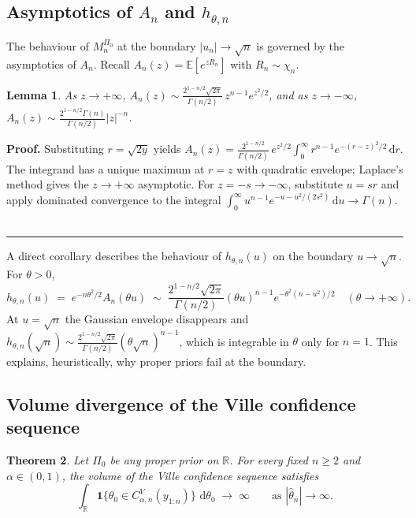 \documentclass{article}%
\newtheorem{theorem}{Theorem}[section]
\newtheorem{lemma}[theorem]{Lemma}
\newenvironment{proof}[1][Proof]{\noindent\textbf{#1.} }{\ \rule{0.5em}{0.5em}}
\newcommand{\R}{\mathbb{R}}
\newcommand{\E}{\mathbb{E}}
\newcommand{\dd}{\,\mathrm{d}}
\newcommand{\one}{\boldsymbol{1}}
\begin{document}
\subsection{Asymptotics of \(A_n\) and \(h_{\theta,n}\)}\label{ssec:asymp}

The behaviour of \(M_n^{\Pi_0}\) at the boundary \(|u_n|\to\sqrt n\) is
governed by the asymptotics of \(A_n\). Recall \(A_n(z)=\E[e^{zR_n}]\)
with \(R_n\sim\chi_n\).

\begin{lemma}\label{lem:An}
As \(z\to+\infty\),
\(A_n(z)\sim \frac{2^{1-n/2}\sqrt{2\pi}}{\Gamma(n/2)}\,z^{n-1}e^{z^2/2}\),
and as \(z\to-\infty\),
\(A_n(z)\sim \frac{2^{1-n/2}\Gamma(n)}{\Gamma(n/2)}|z|^{-n}\).
\end{lemma}

\begin{proof}
Substituting \(r=\sqrt{2y}\) yields
\(A_n(z) = \frac{2^{1-n/2}}{\Gamma(n/2)}\,e^{z^2/2}\int_0^\infty
r^{n-1}e^{-(r-z)^2/2}\dd r\). The integrand has a unique maximum at
\(r=z\) with quadratic envelope; Laplace's method gives the
\(z\to+\infty\) asymptotic. For \(z=-s\to-\infty\), substitute
\(u=sr\) and apply dominated convergence to the integral
\(\int_0^\infty u^{n-1}e^{-u-u^2/(2s^2)}\dd u\to\Gamma(n)\).
\end{proof}

A direct corollary describes the behaviour of \(h_{\theta,n}(u)\) on
the boundary \(u\to\sqrt n\). For \(\theta>0\),
\begin{equation}\label{eq:h-asymp}
  h_{\theta,n}(u)\;=\;e^{-n\theta^2/2}A_n(\theta u)
  \;\sim\;\frac{2^{1-n/2}\sqrt{2\pi}}{\Gamma(n/2)}
   (\theta u)^{n-1}e^{-\theta^2(n-u^2)/2}
   \quad (\theta\to+\infty).
\end{equation}
At \(u=\sqrt n\) the Gaussian envelope disappears and
\(h_{\theta,n}(\sqrt n)\sim \frac{2^{1-n/2}\sqrt{2\pi}}{\Gamma(n/2)}
(\theta\sqrt n)^{n-1}\), which is integrable in \(\theta\) only for
\(n=1\). This explains, heuristically, why proper priors fail at the
boundary.

\subsection{Volume divergence of the Ville confidence sequence}
\label{sec:Ville-divergence}

\begin{theorem}\label{thm:CSVille-divergence}
Let \(\Pi_0\) be any proper prior on \(\R\). For every fixed
\(n\geq 2\) and \(\alpha\in(0,1)\), the volume of the Ville confidence
sequence satisfies
\[
   \int_\R \one\{\theta_0\in C^V_{\alpha,n}(y_{1:n})\}\,\dd\theta_0
   \;\longrightarrow\;\infty
   \qquad\text{as }|\widehat\theta_n|\to\infty.
\]
\end{theorem}
\end{document}
